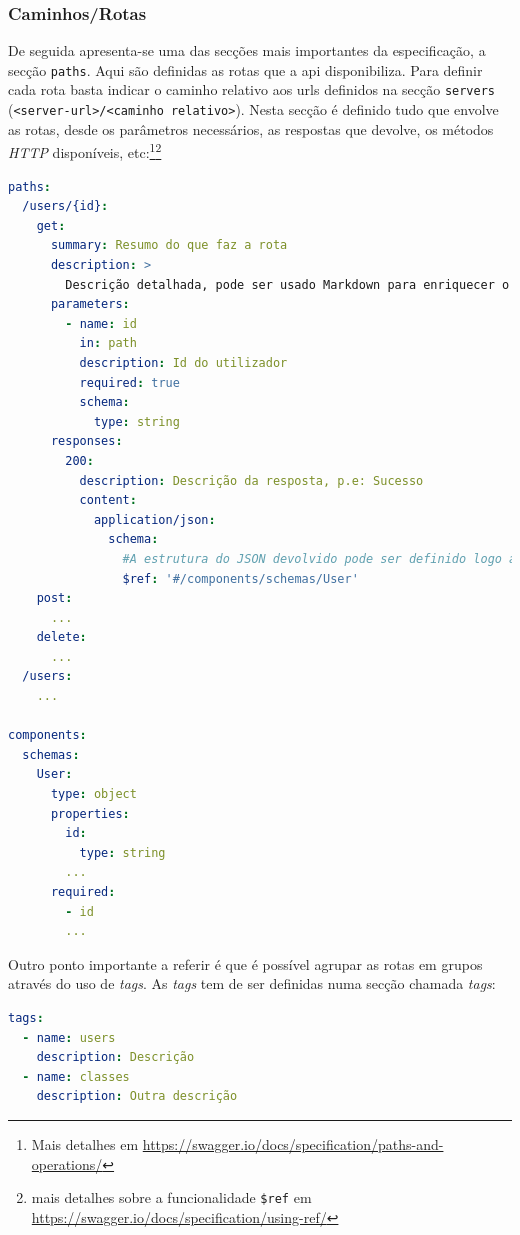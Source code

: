 \subsubsection{Caminhos/Rotas}
De seguida apresenta-se uma das secções mais importantes da especificação, a secção \texttt{paths}. Aqui são definidas as rotas que a \acrshort{api} disponibiliza. Para definir cada rota basta indicar o caminho relativo aos \acrshort{url}s definidos na secção \texttt{servers} (\verb|<server-url>/<caminho relativo>|). Nesta secção é definido tudo que envolve as rotas, desde os parâmetros necessários, as respostas que devolve, os métodos \textit{HTTP} disponíveis, etc:\footnote{Mais detalhes em \url{https://swagger.io/docs/specification/paths-and-operations/}}\footnote{mais detalhes sobre a funcionalidade \texttt{\$ref} em \url{https://swagger.io/docs/specification/using-ref/}}
\begin{lstlisting}[language=yaml, caption=Exemplo de secção \texttt{paths} indicando os detalhes de cada rota na especificação \textit{OpenAPI}, label={exem:oapiRota}]
paths:
  /users/{id}:
    get:
      summary: Resumo do que faz a rota
      description: >
        Descrição detalhada, pode ser usado Markdown para enriquecer o texto
      parameters:
        - name: id
          in: path
          description: Id do utilizador
          required: true
          schema:
            type: string
      responses:
        200:
          description: Descrição da resposta, p.e: Sucesso
          content:
            application/json:
              schema:
                #A estrutura do JSON devolvido pode ser definido logo aqui ou num componente à parte, fazendo referência desse. Iremos aplicar o segundo caso para demonstrar que estas funcionalidades tornam a documentação mais fácil de manter
                $ref: '#/components/schemas/User'
    post:
      ...
    delete:
      ...
  /users:
    ...

components:
  schemas:
    User:
      type: object
      properties:
        id:
          type: string
        ...
      required:
        - id
        ...
\end{lstlisting}

Outro ponto importante a referir é que é possível agrupar as rotas em grupos através do uso de \textit{tags}. As \textit{tags} tem de ser definidas numa secção chamada \textit{tags}:
\begin{lstlisting}[language=yaml, caption={Exemplo de secção \texttt{tags} defininfo tags na especificação \textit{OpenAPI}}]
tags:
  - name: users
    description: Descrição
  - name: classes
    description: Outra descrição
\end{lstlisting}

